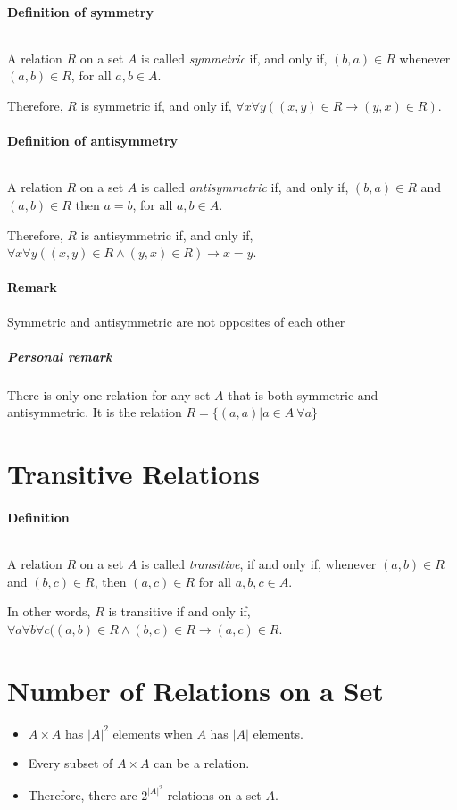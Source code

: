 \documentclass[10pt,a4paper]{book}
\begin{document}
\paragraph*{Definition of symmetry}
$\ $\par 
A relation $R$ on a set $A$ is called \textit{symmetric} if, and only if, $(b,a) \in R$ whenever $(a,b) \in R$, for all $a,b \in A$.\par
Therefore, $R$ is symmetric if, and only if, $\forall x \forall y ((x,y) \in R \to (y,x) \in R)$.

\paragraph*{Definition of antisymmetry}
$\ $\par
A relation $R$ on a set $A$ is called \textit{antisymmetric} if, and only if, $(b,a) \in R$ and $(a,b) \in R$ then $a = b$, for all $a,b \in A$.\par
Therefore, $R$ is antisymmetric if, and only if, $\forall x \forall y ((x,y) \in R \land (y,x) \in R) \to x = y$.

\paragraph*{Remark}
Symmetric and antisymmetric are not opposites of each other
 
\subparagraph*{Personal remark}
There is only one relation for any set $A$ that is both symmetric and antisymmetric. It is the relation $R = \{(a,a)|a \in A \ \forall a\}$

\section{Transitive Relations}

\paragraph*{Definition}
$\ $\par
A relation $R$ on a set $A$ is called \textit{transitive}, if and only if, whenever $(a,b) \in R$ and $(b,c) \in R$, then $(a,c) \in R$ for all $a,b,c \in A$.\par
In other words, $R$ is transitive if and only if, $\forall a \forall b \forall c ((a,b) \in R \land (b,c) \in R \to (a,c) \in R$.

\section{Number of Relations on a Set}
\begin{itemize}
\item $A \times A$ has $|A|^2$ elements when $A$ has $|A|$ elements.
\item Every subset of $A \times A$ can be a relation.
\item Therefore, there are $2^{{|A|}^2}$ relations on a set $A$.
\end{itemize}
\end{document}

